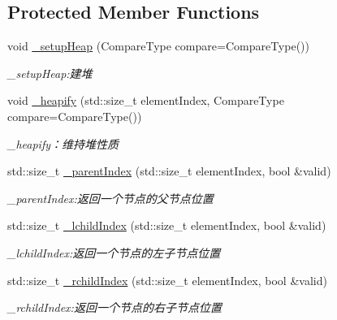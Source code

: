 \subsection*{Protected Member Functions}
\begin{DoxyCompactItemize}
\item 
void \hyperlink{class_introduction_to_algorithm_1_1_sort_algorithm_1_1_sort___heap_a64c05fac6da6e6e0d63e733640d0cf97}{\+\_\+setup\+Heap} (Compare\+Type compare=Compare\+Type())
\begin{DoxyCompactList}\small\item\em \+\_\+setup\+Heap\+:建堆 \end{DoxyCompactList}\item 
void \hyperlink{class_introduction_to_algorithm_1_1_sort_algorithm_1_1_sort___heap_a0535910130c6c750faf7801059e4a9fa}{\+\_\+heapify} (std\+::size\+\_\+t element\+Index, Compare\+Type compare=Compare\+Type())
\begin{DoxyCompactList}\small\item\em \+\_\+heapify：维持堆性质 \end{DoxyCompactList}\item 
std\+::size\+\_\+t \hyperlink{class_introduction_to_algorithm_1_1_sort_algorithm_1_1_sort___heap_a72f5fa2e41901a80fdb9a3bcece8a33f}{\+\_\+parent\+Index} (std\+::size\+\_\+t element\+Index, bool \&valid)
\begin{DoxyCompactList}\small\item\em \+\_\+parent\+Index\+:返回一个节点的父节点位置 \end{DoxyCompactList}\item 
std\+::size\+\_\+t \hyperlink{class_introduction_to_algorithm_1_1_sort_algorithm_1_1_sort___heap_af4033a3e0cd7dab78cb1081f3dece165}{\+\_\+lchild\+Index} (std\+::size\+\_\+t element\+Index, bool \&valid)
\begin{DoxyCompactList}\small\item\em \+\_\+lchild\+Index\+:返回一个节点的左子节点位置 \end{DoxyCompactList}\item 
std\+::size\+\_\+t \hyperlink{class_introduction_to_algorithm_1_1_sort_algorithm_1_1_sort___heap_a71532dbfd31fdb854aa46dbca6e411ac}{\+\_\+rchild\+Index} (std\+::size\+\_\+t element\+Index, bool \&valid)
\begin{DoxyCompactList}\small\item\em \+\_\+rchild\+Index\+:返回一个节点的右子节点位置 \end{DoxyCompactList}\end{DoxyCompactItemize}
